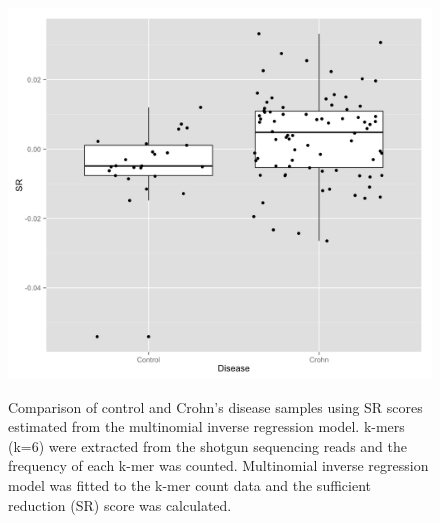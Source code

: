 \begin{figure}[p]
\centering
{\includegraphics[scale=0.25,trim=0 0 0 0,clip]{Figure/F51_SR_control_disease.png}
}
\caption[Comparison of control and Crohn's disease samples using SR scores estimated from the multinomial inverse regression model]{Comparison of control and Crohn's disease samples using SR scores estimated from the multinomial inverse regression model.  k-mers (k=6) were extracted from the shotgun sequencing reads and the frequency of each k-mer was counted. Multinomial inverse regression model was fitted to the k-mer count data and the sufficient reduction (SR) score was calculated.   
}
\label{F51_SR_control_disease}
\end{figure}



